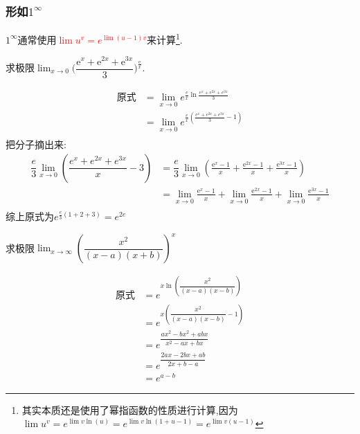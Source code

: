 \documentclass[8pt a4paper, oneside, UTF8]{ctexbook}
\begin{document}
\begin{sloppypar}
    \subsubsection{形如$1^{\infty}$}
         $1 ^ \infty$通常使用\textcolor{red}{$\lim u^v=e^{\lim (u-1)v}$}来计算\footnote{其实本质还是使用了幂指函数的性质进行计算,因为$\lim u^v=e^{\lim v\ln(u)}=e^{\lim v \ln(1 + u -1)}=e^{\lim v (u-1)}$}.
        \begin{problem}
            求极限$\lim_{x\to0}\Bigg(\dfrac{\mathrm{e}^x+\mathrm{e}^{2x}+\mathrm{e}^{3x}}3\Bigg)^{\frac{\mathrm{e}}{x}}.$
        \end{problem}
        \begin{solution}
            \begin{align*}
              \text{原式} & = \lim_{x\to0} e^{\frac{e}{x} \ln \frac{e^x+e^{2x}+e^{3x}}{3}}\\
              & = \lim_{x\to0} e^{\frac{e}{x}(\frac{e^x+e^{2x}+e^{3x}}{3}-1)}\\
            \end{align*}
        把分子摘出来:
        \begin{align*}
          \dfrac{e}{3} \lim_{x\to 0}(\dfrac{e^x+e^{2x}+e^{3x}}{x} -3) & =\dfrac{e}{3} \lim_{x\to 0} (\frac{\mathrm{e}^x-1}x+\frac{\mathrm{e}^{2x}-1}x+\frac{\mathrm{e}^{3x}-1}x)\\
          & = \lim_{x\to0}\frac{\mathrm{e}^{x}-1}{x}+\lim_{x\to0}\frac{\mathrm{e}^{2x}-1}{x}+\lim_{x\to0}\frac{\mathrm{e}^{3x}-1}{x}\\
        \end{align*}
        综上原式为$e^{\frac{e}{3}(1+2+3)}=e^{2e}$
        \end{solution}
        \begin{problem}
            求极限$\lim_{x\to\infty}(\dfrac{x^2}{(x-a)(x+b)})^x$
        \end{problem}
        \begin{solution}
            \begin{align*}
              \text{原式} & =e^{x \ln (\dfrac{x^2}{(x-a)(x-b)})}\\
              & =e^{x(\dfrac{x^2}{(x-a)(x-b)}-1)}\\
              & = e^{\dfrac{ax^2-bx^2+abx}{x^2-ax+bx}}\\
              & = e^{\dfrac{2ax-2bx+ab}{2x+b-a}}\\
              & = e^{a-b}
            \end{align*}
        \end{solution} 

\end{sloppypar}
\end{document}
